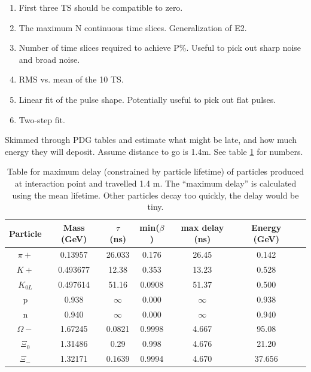

\begin{enumerate}
\item First three TS should be compatible to zero.
\item The maximum N continuous time slices.  Generalization of E2.
\item Number of time slices required to achieve P\%.  Useful to pick out sharp noise and broad noise.
\item RMS vs. mean of the 10 TS.
\item Linear fit of the pulse shape.  Potentially useful to pick out flat pulses.
\item Two-step fit.
\end{enumerate}


Skimmed through PDG tables and estimate what might be late, and how much energy they will deposit.
Assume distance to go is 1.4m.  See table \ref{Table_6265ParticlesMaximumDelay140cm} for numbers.

\begin{center}
\begin{table}
\begin{tabular}{|c|c|c|c|c|c|c|}
\hline
Particle & Mass (GeV) & $\tau$ (ns) & min($\beta$) & max delay (ns) & Energy (GeV) \\
\hline
$\pi+$ & 0.13957 & 26.033 & 0.176 & 26.45 & 0.142 \\
$K+$ & 0.493677 & 12.38 & 0.353 & 13.23 & 0.528 \\
$K_{0L}$ & 0.497614 & 51.16 & 0.0908 & 51.37 & 0.500 \\
p & 0.938 & $\infty$ & 0.000 & $\infty$ & 0.938 \\
n & 0.940 & $\infty$ & 0.000 & $\infty$ & 0.940 \\
$\Omega-$ & 1.67245 & 0.0821 & 0.9998 & 4.667 & 95.08 \\
$\Xi_0$ & 1.31486 & 0.29 & 0.998 & 4.676 & 21.20 \\
$\Xi_-$ & 1.32171 & 0.1639 & 0.9994 & 4.670 & 37.656 \\
\hline
\end{tabular}
\caption{Table for maximum delay (constrained by particle lifetime) of particles produced at interaction point and travelled 1.4 m.
The ``maximum delay'' is calculated using the mean lifetime.  Other particles decay too quickly, the delay would be tiny.}
\label{Table_6265ParticlesMaximumDelay140cm}
\end{table}
\end{center}

